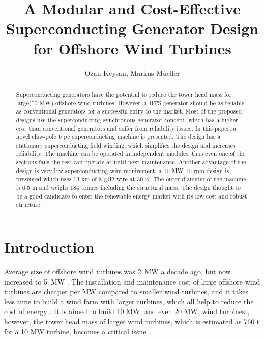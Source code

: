\documentclass[12pt]{iopart}
\begin{document}
\title[]{A Modular and Cost-Effective Superconducting Generator Design for Offshore Wind Turbines}
\author{Ozan Keysan, Markus Mueller}

\address{Institute for Energy Systems,
University of Edinburgh, 
EH93JL, UK}

\begin{abstract}

Superconducting generators have the potential to reduce the tower head mass for large(\~ 10 MW) offshore wind turbines. However, a HTS generator should be as reliable as conventional generators for a successful entry to the market. Most of the proposed designs use the superconducting synchronous generator concept, which has a higher cost than conventional generators and suffer from reliability issues. In this paper, a novel claw-pole type superconducting machine is presented. The design has a stationary superconducting field winding, which simplifies the design and increases reliability. The machine can be operated in independent modules, thus even one of the sections fails the rest can operate at until next maintenance. Another advantage of the design is very low superconducting wire requirement; a 10 MW 10 rpm design is presented which uses 13 km of MgB2 wire at 30 K. The outer
diameter of the machine is 6.5 m and weighs 184 tonnes including the structural mass. The design thought to be a good candidate to enter the renewable energy market with its low cost and robust structure.

\end{abstract}

\maketitle

\section{Introduction}

Average size of offshore wind turbines was 2~MW a decade ago, but now increased to 5~MW \cite{bvg}. The installation and maintenance cost of large offshore wind turbines are cheaper per MW compared to smaller wind turbines, and it takes less time to build a wind farm with larger turbines, which all help to reduce the cost of energy \cite{Bang2008}. It is aimed to build 10 MW, and even 20 MW, wind turbines \cite{upwind}, however, the tower head mass of larger wind turbines, which is estimated as 760 t for a 10 MW turbine, becomes a critical issue \cite{upwind}.
\end{document}
